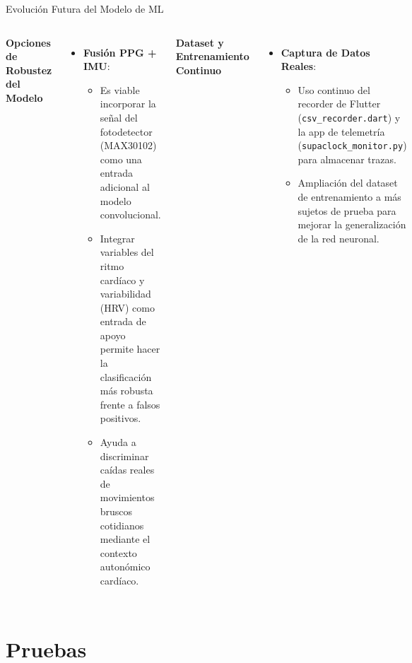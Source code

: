 \documentclass[aspectratio=169, 10pt]{beamer}
\begin{document}
\begin{frame}{Evoluci\'on Futura del Modelo de ML}
    \begin{columns}[T]
        \scriptsize
        \textbf{Opciones de Robustez del Modelo}
        \begin{itemize}\itemsep0.12cm
            \item \textbf{Fusi\'on PPG + IMU}:
                \begin{itemize}\scriptsize\itemsep0.05cm
                    \item Es viable incorporar la se\~nal del fotodetector (MAX30102) como una entrada adicional al modelo convolucional.
                    \item Integrar variables del ritmo card\'iaco y variabilidad (HRV) como entrada de apoyo permite hacer la clasificaci\'on m\'as robusta frente a falsos positivos.
                    \item Ayuda a discriminar ca\'idas reales de movimientos bruscos cotidianos mediante el contexto auton\'omico card\'iaco.
                \end{itemize}
        \end{itemize}
        
        \scriptsize
        \textbf{Dataset y Entrenamiento Continuo}
        \begin{itemize}\itemsep0.12cm
            \item \textbf{Captura de Datos Reales}:
                \begin{itemize}\scriptsize\itemsep0.05cm
                    \item Uso continuo del recorder de Flutter (\texttt{csv\_recorder.dart}) y la app de telemetr\'ia (\texttt{supaclock\_monitor.py}) para almacenar trazas.
                    \item Ampliaci\'on del dataset de entrenamiento a m\'as sujetos de prueba para mejorar la generalizaci\'on de la red neuronal.
                \end{itemize}
        \end{itemize}
    \end{columns}
\end{frame}

\section{Pruebas}
\end{document}
